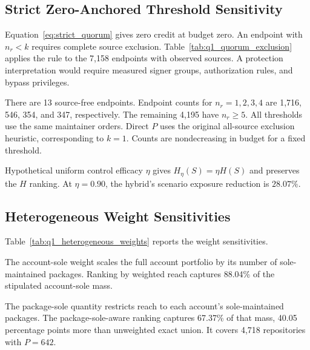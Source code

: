\clearpage
\subsection{Strict Zero-Anchored Threshold Sensitivity}
\label{sec:quorum_exclusion}

Equation~\ref{eq:strict_quorum} gives zero credit at budget zero. An endpoint with $n_r<k$ requires complete source exclusion. Table~\ref{tab:q1_quorum_exclusion} applies the rule to the 7,158 endpoints with observed sources. A protection interpretation would require measured signer groups, authorization rules, and bypass privileges.



There are 13 source-free endpoints. Endpoint counts for $n_r=1,2,3,4$ are 1,716, 546, 354, and 347, respectively. The remaining 4,195 have $n_r\ge5$. All thresholds use the same maintainer orders. Direct $P$ uses the original all-source exclusion heuristic, corresponding to $k=1$. Counts are nondecreasing in budget for a fixed threshold.

Hypothetical uniform control efficacy $\eta$ gives $H_\eta(S)=\eta H(S)$ and preserves the $H$ ranking. At $\eta=0.90$, the hybrid's scenario exposure reduction is $28.07\%$.

\subsection{Heterogeneous Weight Sensitivities}
Table~\ref{tab:q1_heterogeneous_weights} reports the weight sensitivities.


The account-sole weight scales the full account portfolio by its number of sole-maintained packages. Ranking by weighted reach captures 88.04\% of the stipulated account-sole mass.

The package-sole quantity restricts reach to each account's sole-maintained packages. The package-sole-aware ranking captures 67.37\% of that mass, 40.05 percentage points more than unweighted exact union. It covers 4,718 repositories with $P=642$.
\endgroup
